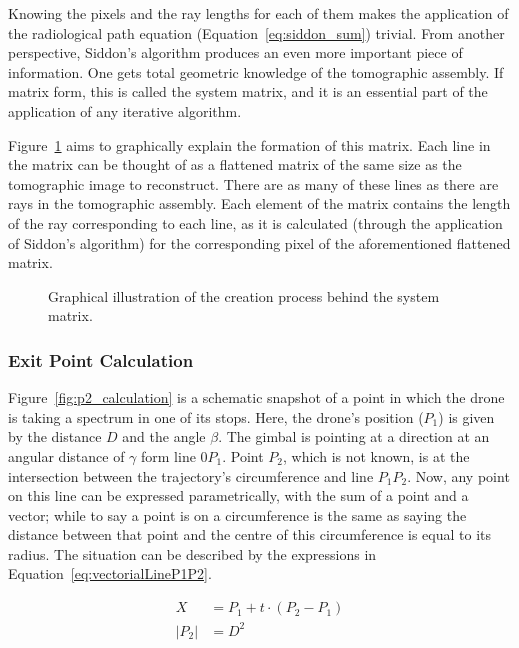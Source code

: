 Knowing the pixels and the ray lengths for each of them makes the
application of the radiological path equation
(Equation~\ref{eq:siddon_sum}) trivial. From another perspective,
Siddon's algorithm produces an even more important piece of information.
One gets total geometric knowledge of the tomographic assembly. If
matrix form, this is called the system matrix, and it is an essential
part of the application of any iterative algorithm.

Figure~\ref{fig:system_matrix} aims to graphically explain the formation
of this matrix. Each line in the matrix can be thought of as a flattened
matrix of the same size as the tomographic image to reconstruct. There
are as many of these lines as there are rays in the tomographic
assembly. Each element of the matrix contains the length of the ray
corresponding to each line, as it is calculated (through the application
of Siddon's algorithm) for the corresponding pixel of the aforementioned
flattened matrix.

\begin{figure}[htpb]
    \centering
    \caption{Graphical illustration of the creation process behind the
    system matrix.}
    \label{fig:system_matrix}
\end{figure}

\subsubsection{Exit Point Calculation}%
\label{ssub:exit_point_calculation}

Figure~\ref{fig:p2_calculation} is a schematic snapshot of a point in
which the drone is taking a spectrum in one of its stops. Here, the
drone's position ($P_1$) is given by the distance $D$ and the angle
$\beta$. The gimbal is pointing at a direction at an angular distance of
$\gamma$ form line $0P_1$. Point $P_2$, which is not known, is at the
intersection between the trajectory's circumference and line $P_1P_2$.
Now, any point on this line can be expressed parametrically, with the
sum of a point and a vector; while to say a point is on a circumference
is the same as saying the distance between that point and the centre of
this circumference is equal to its radius. The situation can be
described by the expressions in Equation~\ref{eq:vectorialLineP1P2}.

\begin{equation}
    \label{eq:vectorialLineP1P2}
    \begin{aligned}
        X &= P_1 + t \cdot (P_2 - P_1)\\
    |P_2| &= D^2\\ 
    \end{aligned}
\end{equation}

